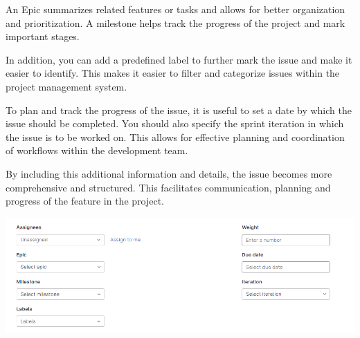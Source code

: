 \documentclass[12pt]{article}
\begin{document}
An Epic summarizes related features or tasks and allows for better organization and prioritization. 
A milestone helps track the progress of the project and mark important stages.

In addition, you can add a predefined label to further mark the issue and make it easier to identify. This makes it easier to filter and categorize issues within the project management system.

To plan and track the progress of the issue, it is useful to set a date by which the issue should be completed. You should also specify the sprint iteration in which the issue is to be worked on. This allows for effective planning and coordination of workflows within the development team.

By including this additional information and details, the issue becomes more comprehensive and structured. This facilitates communication, planning and progress of the feature in the project.

 \includegraphics[width=\textwidth]{issue2.png}
 
\end{document}
